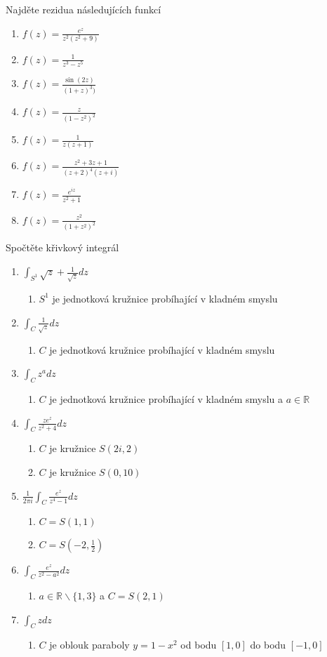 \begin{multicols}{2}
\separator

Najděte rezidua následujících funkcí
\begin{enumerate}
\item $f(z) = \frac{e^z}{z^2 (z^2 + 9)}$
\item $f(z) = \frac{1}{z^3 - z^5}$
\item $f(z) = \frac{\sin (2z)}{(1+z)^3)}$
\item $f(z) = \frac{z}{\left( 1 - z^2 \right)^2}$
\item $f(z) = \frac{1}{z (z+1)}$
\item $f(z) = \frac{z^2 + 3z + 1}{(z+2)^4 (z+i)}$
\item $f(z) = \frac{e^{iz}}{z^2 + 1}$
\item $f(z)=\frac{z^2}{(1+z^2)^2}$
\end{enumerate}

\separator

Spočtěte křivkový integrál
\begin{enumerate}
\item $\int_{S^1} \sqrt{z} + \frac{1}{\sqrt{z}} dz$
	\begin{enumerate}
	\item $S^1$ je jednotková kružnice probíhající v kladném smyslu
	\end{enumerate}
\item $\int_C \frac{1}{\sqrt{z}} dz$
	\begin{enumerate}
	\item $C$ je jednotková kružnice probíhající v kladném smyslu
	\end{enumerate}
\item $\int_C z^a dz$
	\begin{enumerate}
	\item $C$ je jednotková kružnice probíhající v kladném smyslu  a $a \in \mathbb{R}$
	\end{enumerate}
\item $\int_C \frac{z e^z}{z^2 + 4} dz$
	\begin{enumerate}
	\item $C$ je kružnice $S(2i, 2)$
	\item $C$ je kružnice $S(0,10)$
	\end{enumerate}
\item $\frac{1}{2 \pi i} \int_C \frac{e^z}{z^4 - 1} dz$
	\begin{enumerate}
	\item $C = S(1,1)$
	\item $C = S \left(-2,\frac{1}{2} \right)$
	\end{enumerate}
\item $\int_C \frac{e^z}{z^2 - a^2} dz$
	\begin{enumerate}
	\item $a \in \mathbb{R} \backslash \{ 1, 3 \}$ a $C = S(2,1)$
	\end{enumerate}
\item $\int_C z dz$
	\begin{enumerate}
	\item $C$ je oblouk paraboly $y = 1-x^2$ od bodu $[1,0]$ do bodu $[-1,0]$
	\end{enumerate}
\end{enumerate}


\end{multicols}
